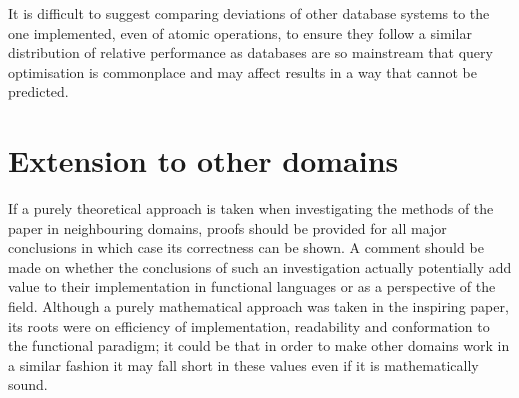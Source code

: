 It is difficult to suggest comparing deviations of other database systems to the one implemented, even of atomic operations, to ensure they follow a similar distribution of relative performance as databases are so mainstream that query optimisation is commonplace and may affect results in a way that cannot be predicted.

\section{Extension to other domains}
If a purely theoretical approach is taken when investigating the methods of the paper in neighbouring domains, proofs should be provided for all major conclusions in which case its correctness can be shown. A comment should be made on whether the conclusions of such an investigation actually potentially add value to their implementation in functional languages or as a perspective of the field. Although a purely mathematical approach was taken in the inspiring paper, its roots were on efficiency of implementation, readability and conformation to the functional paradigm; it could be that in order to make other domains work in a similar fashion it may fall short in these values even if it is mathematically sound.